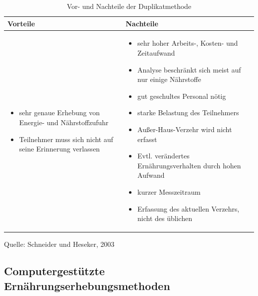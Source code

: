 
\begin{table}[!h]
\begin{flushleft}
\caption{Vor- und Nachteile der Duplikatmethode }
\end{flushleft}
\begin{tabular}{p{7cm} p{7cm}}
Vorteile & Nachteile \\
\hline

\begin{itemize}
\item sehr genaue Erhebung von Energie- und Nährstoffzufuhr
\item Teilnehmer muss sich nicht auf seine Erinnerung verlassen

\end{itemize}

&

\begin{itemize}
\item sehr hoher Arbeits-, Kosten- und Zeitaufwand
\item Analyse beschränkt sich meist auf nur einige Nährstoffe
\item gut geschultes Personal nötig
\item starke Belastung des Teilnehmers
\item Außer-Haus-Verzehr wird nicht erfasst
\item Evtl. verändertes Ernährungsverhalten durch hohen Aufwand
\item kurzer Messzeitraum
\item Erfassung des aktuellen Verzehrs, nicht des üblichen




\end{itemize}
\end{tabular}
\label{tab:Verzehrsprotokoll2}
Quelle: Schneider und Heseker, 2003
\end{table}

\subsection{Computergestützte Ernährungserhebungsmethoden}

